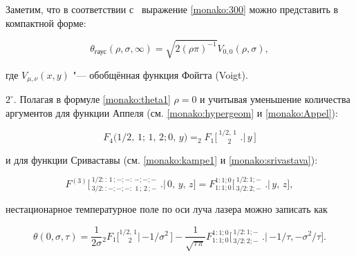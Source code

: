 Заметим, что в соответствии с~\cite{manako:srivastava2} выражение \eqref{monako:300} можно представить в компактной форме:

$$ \theta_{\text {гаус}}(\rho,\sigma,\infty)=\sqrt{{2}({\rho\pi})^{-1}}V_{0,0}(\rho,\sigma), $$

где $V_{\mu,\nu}(x,y)$ "--- обобщённая функция Фойгта (Voigt). %






\smallskip



$2^\circ$. Полагая в формуле \eqref{monako:theta1} $ \rho=0 $ и учитывая уменьшение количества аргументов для функции Аппеля (см. \eqref{monako:hypergeom} и \eqref{monako:Appel}):

$$ F_4\big(1 / 2,\,1;\,1,\,2;0,\,y\big)=  _{2}F_{1}\bigg[\,^{\displaystyle 1 / 2,\,1}_{\displaystyle \quad \,\, 2}\,\,\bigg.\bigg|\,y\,\bigg] $$

и для функции Сриваставы (см. \eqref{monako:kampe1} и \eqref{monako:srivastava}):

$$F^{(3)}\bigg[\,^{\displaystyle 1 / 2::\,1\,;-;-:\,-;-;-}_{\displaystyle 3 / 2::-;-;-:\,\,1\,;\,2\,;-}\,\,\bigg.\bigg|\,0,\,y,\,z\bigg]=F_{1:1;0}^{1:1;0}\bigg[\,^{\displaystyle 1 / 2:1;-}_{\displaystyle 3 / 2:2;-}\,\,\bigg.\bigg|\,y,\,z\bigg],$$

нестационарное температурное поле по оси луча лазера можно записать как

\begin{equation}

\label{monako:18} \!

\theta(0, \sigma,\tau)=\frac{1}{2\sigma}{}_{2}F_{1}\bigg[{}^{\displaystyle 1 / 2,\,1}_{\displaystyle \quad \,\, 2} \bigg|\,{-1}/{\sigma^2}\,\bigg]-\frac{1}{\sqrt{\tau\pi}}F_{1:1;0}^{1:1;0}\bigg[\,^{\displaystyle 1 / 2:1;-}_{\displaystyle 3 / 2:2;-}\,\,\bigg.\bigg|\,{-1}/{\tau}, {-\sigma^2}/{\tau}\bigg]. \!

\end{equation}

